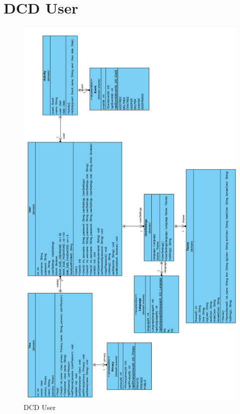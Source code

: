 \documentclass[pdftex,a4paper,12pt,twoside]{report}
\begin{document}
\section{DCD User}
\begin{figure}[!htb]
\includegraphics[width=\textwidth, height=\textheight]{images/DCDUser.png}
\caption{DCD User}
\end{figure}
\end{document}
